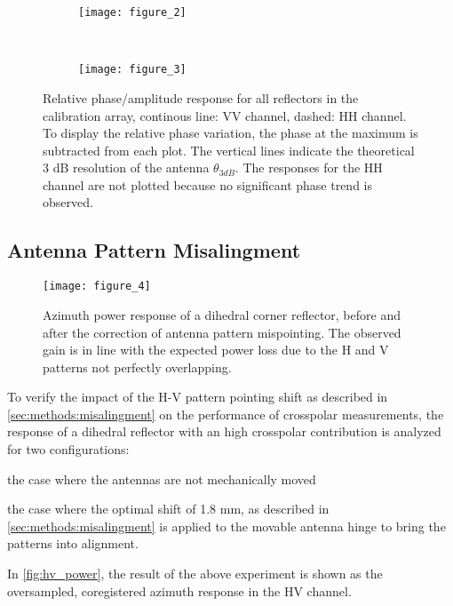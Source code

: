\begin{figure*}[ht]
	\centering
	\begin{subfigure}[t]{\textwidth}
		\centering
		\texttt{[image: figure\_2]}
		\label{fig:phase_response_VV:uncorrected}
	\end{subfigure}\\
	\begin{subfigure}[t]{\textwidth}
		\centering
		\texttt{[image: figure\_3]}
		\label{fig:phase_response_VV:corrected}
	\end{subfigure}
	\caption{Relative phase/amplitude response for all reflectors in the calibration array, continous line: VV channel, dashed: HH channel. To display the relative phase variation, the phase at the maximum is subtracted from each plot. The vertical lines indicate the theoretical 3 dB resolution of the antenna $\theta_{3dB}$. The responses for the HH channel are not plotted because no significant phase trend is observed.}
	\label{fig:phase_response_VV}
\end{figure*}

\subsection{Antenna Pattern Misalingment}\label{sec:results:misalignment}
\begin{figure*}[ht!]
	\centering
	\texttt{[image: figure\_4]}
	\caption{Azimuth power response of a dihedral corner reflector, before and after the correction of antenna pattern mispointing. The observed gain is in line with the expected power loss due to the H and V patterns not perfectly overlapping.}
	\label{fig:hv_power}
\end{figure*}
To verify the impact of the H-V pattern pointing shift as described in \autoref{sec:methods:misalingment} on the performance of crosspolar measurements, the response of a dihedral reflector with an high crosspolar contribution is analyzed for two configurations:\\ \begin{enumerate*}\item the case where the antennas are not mechanically moved \item the case where the optimal shift of 1.8 mm, as described in \autoref{sec:methods:misalingment} is applied to the movable antenna hinge to bring the patterns into alignment.\\ 
\end{enumerate*}
In \autoref{fig:hv_power}, the result of the above experiment is shown as the oversampled, coregistered azimuth response in the HV channel.
